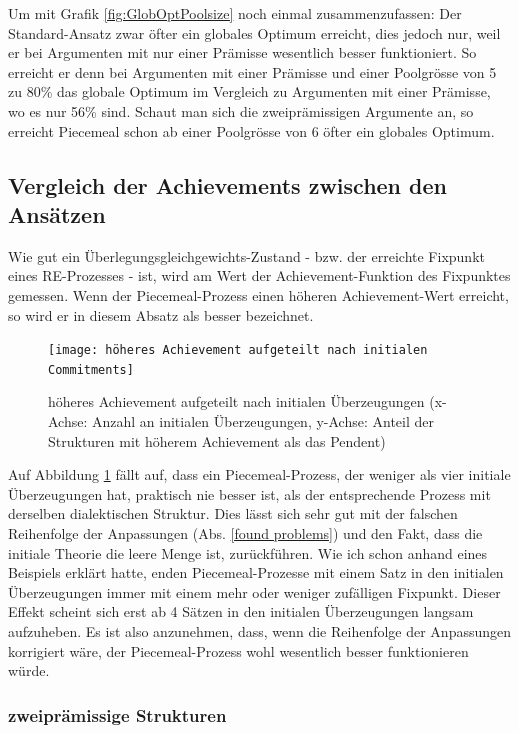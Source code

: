 \documentclass{article}
\begin{document}
Um mit Grafik \ref{fig:GlobOptPoolsize} noch einmal zusammenzufassen: Der Standard-Ansatz zwar öfter ein globales Optimum erreicht, dies jedoch nur, weil er bei Argumenten mit nur einer Prämisse wesentlich besser funktioniert. So erreicht er denn bei Argumenten mit einer Prämisse und einer Poolgrösse von 5 zu 80\% das globale Optimum im Vergleich zu Argumenten mit einer Prämisse, wo es nur 56\% sind. Schaut man sich die zweiprämissigen Argumente an, so erreicht Piecemeal schon ab einer Poolgrösse von 6 öfter ein globales Optimum.

\subsection{Vergleich der Achievements zwischen den Ansätzen}

Wie gut ein Überlegungsgleichgewichts-Zustand - bzw. der erreichte Fixpunkt eines RE-Prozesses - ist, wird am Wert der Achievement-Funktion des Fixpunktes gemessen. Wenn der Piecemeal-Prozess einen höheren Achievement-Wert erreicht, so wird er in diesem Absatz als besser bezeichnet.

\begin{figure}[ht]
  \centering
  \texttt{[image: höheres Achievement aufgeteilt nach initialen Commitments]}
  \caption{höheres Achievement aufgeteilt nach initialen Überzeugungen (x-Achse: Anzahl an initialen Überzeugungen, y-Achse: Anteil der Strukturen mit höherem Achievement als das Pendent) \label{fig:höheres Achievement aufgeteilt nach initialen Commitments}}
\end{figure}

Auf Abbildung \ref{fig:höheres Achievement aufgeteilt nach initialen Commitments} fällt auf, dass ein Piecemeal-Prozess, der weniger als vier initiale Überzeugungen hat, praktisch nie besser ist, als der entsprechende Prozess mit derselben dialektischen Struktur. Dies lässt sich sehr gut mit der falschen Reihenfolge der Anpassungen (Abs. \ref{found problems}) und den Fakt, dass die initiale Theorie die leere Menge ist, zurückführen. Wie ich schon anhand eines Beispiels erklärt hatte, enden Piecemeal-Prozesse mit einem Satz in den initialen Überzeugungen immer mit einem mehr oder weniger zufälligen Fixpunkt. Dieser Effekt scheint sich erst ab 4 Sätzen in den initialen Überzeugungen langsam aufzuheben. Es ist also anzunehmen, dass, wenn die Reihenfolge der Anpassungen korrigiert wäre, der Piecemeal-Prozess wohl wesentlich besser funktionieren würde.

\subsubsection{zweiprämissige Strukturen}
\end{document}
